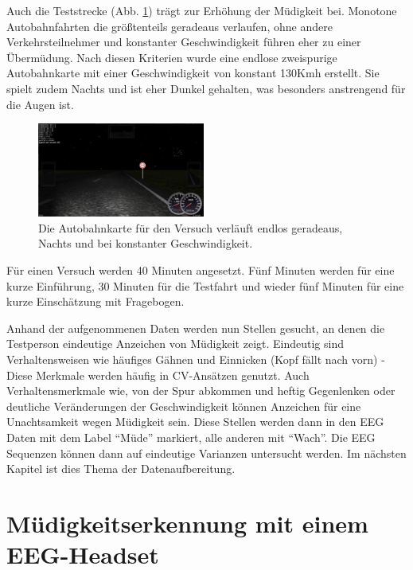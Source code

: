 {Auch die Teststrecke (Abb. \ref{fig:drivingtask}) trägt zur Erhöhung der Müdigkeit bei. Monotone Autobahnfahrten die größtenteils geradeaus verlaufen, ohne andere Verkehrsteilnehmer und konstanter Geschwindigkeit führen eher zu einer Übermüdung. Nach diesen Kriterien wurde eine endlose zweispurige Autobahnkarte mit einer Geschwindigkeit von konstant 130Kmh erstellt. Sie spielt zudem Nachts und ist eher Dunkel gehalten, was besonders anstrengend für die Augen ist.

\begin{figure}[h] 
  \begin{center}
    \includegraphics[width=5.5cm]{drivingtask}
    \caption[Driving Task]{Die Autobahnkarte für den Versuch verläuft endlos geradeaus, Nachts und bei konstanter Geschwindigkeit. \label{fig:drivingtask}}
  \end{center}
\end{figure}

Für einen Versuch werden 40 Minuten angesetzt. Fünf Minuten werden für eine kurze Einführung, 30 Minuten für die Testfahrt und wieder fünf Minuten für eine kurze Einschätzung mit Fragebogen.

Anhand der aufgenommenen Daten werden nun Stellen gesucht, an denen die Testperson eindeutige Anzeichen von Müdigkeit zeigt. Eindeutig sind Verhaltensweisen wie häufiges Gähnen und Einnicken (Kopf fällt nach vorn) - Diese Merkmale werden häufig in CV-Ansätzen genutzt. 
Auch Verhaltensmerkmale wie, von der Spur abkommen und heftig Gegenlenken oder deutliche Veränderungen der Geschwindigkeit können Anzeichen für eine Unachtsamkeit wegen Müdigkeit sein.
Diese Stellen werden dann in den EEG Daten mit dem Label "`Müde"' markiert, alle anderen mit "`Wach"'. Die EEG Sequenzen können dann auf eindeutige Varianzen untersucht werden. Im nächsten Kapitel ist dies Thema der  Datenaufbereitung.



\section{Müdigkeitserkennung mit einem EEG-Headset}
\label{chap:implementation}

}
